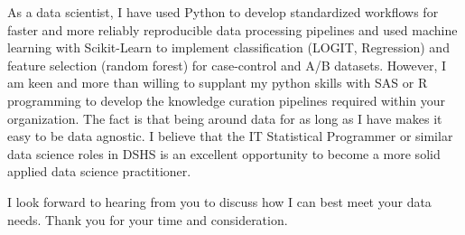\documentclass[13pt, letterpaper]{russell}
\begin{document}
\begin{cvletter}
 As a data scientist, I have used Python to develop standardized workflows for faster and more reliably reproducible data processing pipelines and used machine learning with Scikit-Learn to implement classification (LOGIT, Regression) and feature selection (random forest) for case-control and A/B datasets. However, I am keen and more than willing to supplant my python skills with SAS or R programming to develop the knowledge curation pipelines required within your organization. The fact is that being around data for as long as I have makes it easy to be data agnostic. I believe that the IT Statistical Programmer or similar data science roles in DSHS is an excellent opportunity to become a more solid applied data science practitioner. 
 
 I look forward to hearing from you to discuss how I can best meet your data needs. Thank you for your time and consideration.

\end{cvletter}

\makeletterclosing
\end{document}
